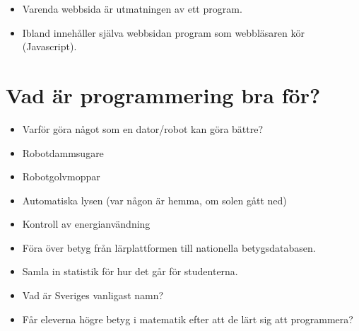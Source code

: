 \begin{frame}
  \begin{example}
    \begin{itemize}
      \item Varenda webbsida är utmatningen av ett program.
      \item Ibland innehåller själva webbsidan program som webbläsaren kör 
        (Javascript).
    \end{itemize}
  \end{example}
\end{frame}


\section[Vad är det bra för?]{Vad är programmering bra för?}

\begin{frame}
  \begin{question}
    \begin{itemize}
      \item Varför göra något som en dator/robot kan göra bättre?
    \end{itemize}
  \end{question}
\end{frame}

\begin{frame}
  \begin{example}[Hemautomation]
    \begin{itemize}
      \item Robotdammsugare
      \item Robotgolvmoppar
      \item Automatiska lysen (var någon är hemma, om solen gått ned)
      \item Kontroll av energianvändning
    \end{itemize}
  \end{example}
\end{frame}

\begin{frame}
  \begin{example}
    \begin{itemize}
      \item Föra över betyg från lärplattformen till nationella 
        betygsdatabasen.
      \item Samla in statistik för hur det går för studenterna.
    \end{itemize}
  \end{example}

  \begin{example}
    \begin{itemize}
      \item Vad är Sveriges vanligast namn?
      \item Får eleverna högre betyg i matematik efter att de lärt sig att 
        programmera?
    \end{itemize}
  \end{example}
\end{frame}

